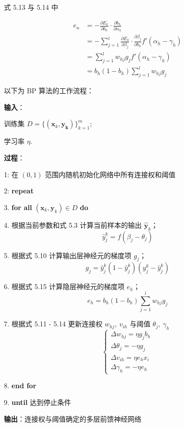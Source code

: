 \documentclass[../studies-ml.tex]{subfiles}
\begin{document}

式 5.13 与 5.14 中

\begin{equation}
  \begin{split}
    e_n & = -\frac{\partial E_k}{\partial b_h} \cdot \frac{\partial b_h}{\partial \alpha_h} \\
    & = -\sum_{j=1}^{i} \frac{\partial E_k}{\partial \beta_j} \cdot \frac{\partial \beta_j}{\partial b_h} f'(\alpha_h - \gamma_h) \\
    & = \sum_{j=1}^{l} w_{hj} g_j f'(\alpha_h - \gamma_h) \\
    & = b_h (1 - b_h) \sum_{j=1}^{l} w_{hj} g_j
  \end{split}
\end{equation}

\newpage
以下为 BP 算法的工作流程：

\begin{shaded}
  \textbf{输入}：

  训练集 $D = \{(\pmb{x}_k, \pmb{y_k})\}_{k=1}^m$;

  学习率 $\eta$.
  \bigskip

  \textbf{过程}：

  1: 在 $(0,1)$ 范围内随机初始化网络中所有连接权和阈值

  2: \textbf{repeat}

  3. \aidnt \textbf{for all} $(\pmb{x}_k, \pmb{y}_k) \in D$ \textbf{do}

  4. \aidnt[2] 根据当前参数和式 5.3 计算当前样本的输出 $\hat{\pmb{y}}_k$；
  \[ \hat{y}_j^k = f(\beta_j - \theta_j) \]

  5. \aidnt[2] 根据式 5.10 计算输出层神经元的梯度项 $g_j$；
  \[ g_j = \hat{y}_j^k (1 - \hat{y}_j^k) (y_j^k - \hat{y}_j^k) \]

  6. \aidnt[2] 根据式 5.15 计算隐层神经元的梯度项 $e_h$；
  \[ e_h = b_h (1 - b_h) \sum_{j=1}^{l} w_{hj} g_j \]

  7. \aidnt[2] 根据式 5.11 - 5.14 更新连接权 $w_{hj},\ v_{ih}$ 与阈值 $\theta_j,\ \gamma_h$
  \begin{equation*}
    \begin{cases}
      \Delta w_{hj} = \eta g_j b_h \\
      \Delta \theta_j = -\eta g_j  \\
      \Delta v_{ih} = \eta e_h x_i \\
      \Delta \gamma_h = -\eta e_h
    \end{cases}
  \end{equation*}

  8. \aidnt \textbf{end for}

  9. \textbf{until} 达到停止条件

  \textbf{输出}：连接权与阈值确定的多层前馈神经网络
\end{shaded}
\end{document}
